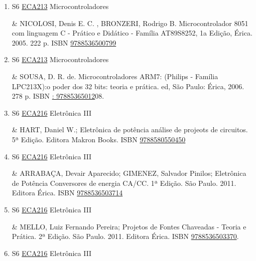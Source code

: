 \documentclass[12pt,a4paper]{book}
\begin{document}
\begin{enumerate}
&  NICOLOSI, Denis E.  C.  Laboratório de Microcontroladores: Família 8051, Treino de
instruções, hardware e softw, 2a Edição, Editora Érica.  ISBN \href{http://www.bn.br/site/pages/servicosProfissionais/agenciaISBN/isbnBusca/FbnBuscaISBNCatalogo.asp?pField=ISBN&pIntPagina=1&pISBN=71948716&nidbISBN=true&hidbISBN=true}{9788571948716}
 

 \item S6 \hyperref[PUD:ECA213]{ECA213} Microcontroladores

&  NICOLOSI, Denis E.  C. , BRONZERI, Rodrigo B.  Microcontrolador 8051 com linguagem C -
Prático e Didático - Família AT89S8252, 1a Edição, Érica.  2005.  222 p.  ISBN \href{http://www.bn.br/site/pages/servicosProfissionais/agenciaISBN/isbnBusca/FbnBuscaISBNCatalogo.asp?pField=ISBN&pIntPagina=1&pISBN=36500799&nidbISBN=true&hidbISBN=true}{9788536500799}
 

 \item S6 \hyperref[PUD:ECA213]{ECA213} Microcontroladores

&  SOUSA, D.  R.  de.  Microcontroladores ARM7: (Philips - Família LPC213X):o poder dos 32 bits: teoria e prática.  ed, São Paulo: Érica, 2006.  278 p.  ISBN \href{http://www.google.com/search?hl=pt-BR&tbo=p&tbm=bks&q=isbn:: 97885365012&num=10}{: 97885365012}08.
 \item S6 \hyperref[PUD:ECA216]{ECA216} Eletrônica III

& HART, Daniel W.;  Eletrônica de potência análise de projeots de circuitos.  5ª Edição.  Editora Makron Books.  ISBN \href{http://www.bn.br/site/pages/servicosProfissionais/agenciaISBN/isbnBusca/FbnBuscaISBNCatalogo.asp?pField=ISBN&pIntPagina=1&pISBN=80550450&nidbISBN=true&hidbISBN=true}{9788580550450}
 

 \item S6 \hyperref[PUD:ECA216]{ECA216} Eletrônica III

& ARRABAÇA, Devair Aparecido;  GIMENEZ, Salvador Pinilos;  Eletrônica de Potência Conversores de energia CA/CC.  1ª Edição.  São Paulo.  2011.  Editora Érica.  ISBN \href{http://www.bn.br/site/pages/servicosProfissionais/agenciaISBN/isbnBusca/FbnBuscaISBNCatalogo.asp?pField=ISBN&pIntPagina=1&pISBN=36503714&nidbISBN=true&hidbISBN=true}{9788536503714}
 

 \item S6 \hyperref[PUD:ECA216]{ECA216} Eletrônica III

& MELLO, Luiz Fernando Pereira;  Projetos de Fontes Chaveadas - Teoria e Prática.   2ª Edição.  São Paulo.  2011.  Editora Érica.  ISBN \href{http://www.bn.br/site/pages/servicosProfissionais/agenciaISBN/isbnBusca/FbnBuscaISBNCatalogo.asp?pField=ISBN&pIntPagina=1&pISBN=36503370&nidbISBN=true&hidbISBN=true}{9788536503370}.
 \item S6 \hyperref[PUD:ECA216]{ECA216} Eletrônica III


\end{enumerate}
\end{document}
